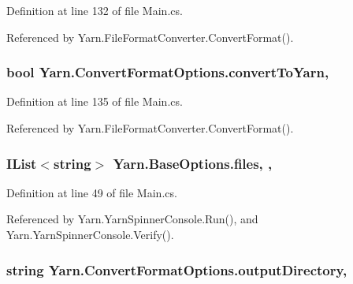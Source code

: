 Definition at line 132 of file Main.\-cs.



Referenced by Yarn.\-File\-Format\-Converter.\-Convert\-Format().

\hypertarget{a00060_a052d6f00647c503adc5a79a1ff92cdf4}{
\subsubsection[{convert\-To\-Yarn}]{\setlength{\rightskip}{0pt plus 5cm}bool Yarn.\-Convert\-Format\-Options.\-convert\-To\-Yarn\hspace{0.3cm}{\ttfamily [get]}, {\ttfamily [set]}}}\label{a00060_a052d6f00647c503adc5a79a1ff92cdf4}


Definition at line 135 of file Main.\-cs.



Referenced by Yarn.\-File\-Format\-Converter.\-Convert\-Format().

\hypertarget{a00043_aa93cbb1bc1d5328e0a417012621e92d2}{
\subsubsection[{files}]{\setlength{\rightskip}{0pt plus 5cm}I\-List$<$string$>$ Yarn.\-Base\-Options.\-files\hspace{0.3cm}{\ttfamily [get]}, {\ttfamily [set]}, {\ttfamily [inherited]}}}\label{a00043_aa93cbb1bc1d5328e0a417012621e92d2}


Definition at line 49 of file Main.\-cs.



Referenced by Yarn.\-Yarn\-Spinner\-Console.\-Run(), and Yarn.\-Yarn\-Spinner\-Console.\-Verify().

\hypertarget{a00060_ab636bde93c2204b2af1a9306560d9749}{
\subsubsection[{output\-Directory}]{\setlength{\rightskip}{0pt plus 5cm}string Yarn.\-Convert\-Format\-Options.\-output\-Directory\hspace{0.3cm}{\ttfamily [get]}, {\ttfamily [set]}}}\label{a00060_ab636bde93c2204b2af1a9306560d9749}


